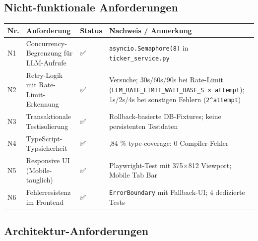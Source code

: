 \subsection{Nicht-funktionale
Anforderungen}\label{nicht-funktionale-anforderungen}

{\def\LTcaptype{none} %
\begin{longtable}[]{@{}
  >{\raggedright\arraybackslash}p{}
  >{\raggedright\arraybackslash}p{}
  >{\raggedright\arraybackslash}p{}
  >{\raggedright\arraybackslash}p{}@{}}
\toprule\noalign{}
\begin{minipage}[b]{\linewidth}\raggedright
Nr.
\end{minipage} & \begin{minipage}[b]{\linewidth}\raggedright
Anforderung
\end{minipage} & \begin{minipage}[b]{\linewidth}\raggedright
Status
\end{minipage} & \begin{minipage}[b]{\linewidth}\raggedright
Nachweis / Anmerkung
\end{minipage} \\
\midrule\noalign{}
\endhead
\bottomrule\noalign{}
\endlastfoot
N1 & Concurrency-Begrenzung für LLM-Aufrufe & ✅ &
\texttt{asyncio.Semaphore(8)} in \texttt{ticker\_service.py} \\
N2 & Retry-Logik mit Rate-Limit-Erkennung & ✅ & 3 Versuche; 30s/60s/90s
bei Rate-Limit (\texttt{LLM\_RATE\_LIMIT\_WAIT\_BASE\_S\ ×\ attempt});
1s/2s/4s bei sonstigen Fehlern (\texttt{2\^{}attempt}) \\
N3 & Transaktionale Testisolierung & ✅ & Rollback-basierte DB-Fixtures;
keine persistenten Testdaten \\
N4 & TypeScript-Typsicherheit & ✅ & 95,84 \% type-coverage; 0
Compiler-Fehler \\
N5 & Responsive UI (Mobile-tauglich) & ✅ & Playwright-Test mit 375×812
Viewport; Mobile Tab Bar \\
N6 & Fehlerresistenz im Frontend & ✅ & \texttt{ErrorBoundary} mit
Fallback-UI; 4 dedizierte Tests \\
\end{longtable}
}

\subsection{Architektur-Anforderungen}\label{architektur-anforderungen}

